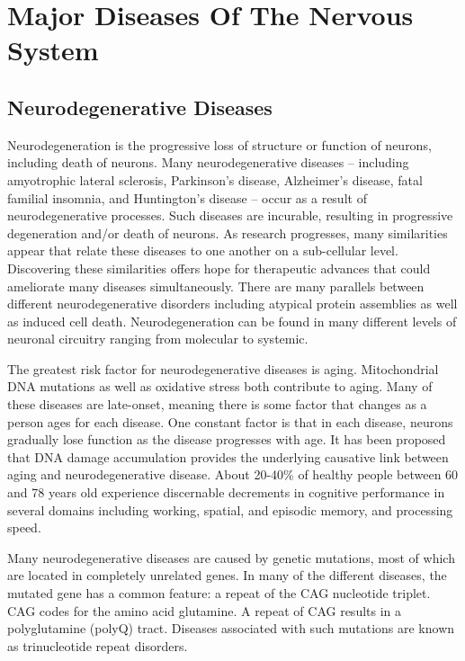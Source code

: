 \hypertarget{major-diseases-of-the-nervous-system}{%
\chapter{Major Diseases Of The Nervous
System}\label{major-diseases-of-the-nervous-system}}

\hypertarget{neurodegenerative-diseases}{%
\section{Neurodegenerative
Diseases}\label{neurodegenerative-diseases}}

Neurodegeneration is the progressive loss of structure or function of
neurons, including death of neurons. Many neurodegenerative diseases --
including amyotrophic lateral sclerosis, Parkinson's disease,
Alzheimer's disease, fatal familial insomnia, and Huntington's disease
-- occur as a result of neurodegenerative processes. Such diseases are
incurable, resulting in progressive degeneration and/or death of
neurons. As research progresses, many similarities appear that relate
these diseases to one another on a sub-cellular level. Discovering these
similarities offers hope for therapeutic advances that could ameliorate
many diseases simultaneously. There are many parallels between different
neurodegenerative disorders including atypical protein assemblies as
well as induced cell death. Neurodegeneration can be found in many
different levels of neuronal circuitry ranging from molecular to
systemic.

The greatest risk factor for neurodegenerative diseases is aging.
Mitochondrial DNA mutations as well as oxidative stress both contribute
to aging. Many of these diseases are late-onset, meaning there is some
factor that changes as a person ages for each disease. One constant
factor is that in each disease, neurons gradually lose function as the
disease progresses with age. It has been proposed that DNA damage
accumulation provides the underlying causative link between aging and
neurodegenerative disease. About 20-40\% of healthy people between 60
and 78 years old experience discernable decrements in cognitive
performance in several domains including working, spatial, and episodic
memory, and processing speed.

Many neurodegenerative diseases are caused by genetic mutations, most of
which are located in completely unrelated genes. In many of the
different diseases, the mutated gene has a common feature: a repeat of
the CAG nucleotide triplet. CAG codes for the amino acid glutamine. A
repeat of CAG results in a polyglutamine (polyQ) tract. Diseases
associated with such mutations are known as trinucleotide repeat
disorders.

